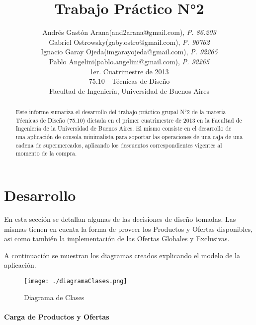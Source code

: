 \documentclass[a4paper,11pt]{article}
\title{\textbf{Trabajo Práctico N°2}}
\author{
  Andrés Gastón Arana(and2arana@gmail.com), \textit{P. 86.203}     \\
  Gabriel Ostrowsky(gaby.ostro@gmail.com), \textit{P. 90762}       \\
  Ignacio Garay Ojeda(imgarayojeda@gmail.com), \textit{P. 92265}   \\
  Pablo Angelini(pablo.angelini@gmail.com), \textit{P. 92265}      \\
  \normalsize{1er. Cuatrimestre de 2013}                           \\
  \normalsize{75.10 - Técnicas de Diseño}                          \\
  \normalsize{Facultad de Ingeniería, Universidad de Buenos Aires}
}
\date{}
\begin{document}
\thispagestyle{empty}
\maketitle

\begin{abstract}

  Este informe sumariza el desarrollo del trabajo práctico grupal N°2 de la
  materia Técnicas de Diseño (75.10) dictada en el primer cuatrimestre de 2013
  en la Facultad de Ingeniería de la Universidad de Buenos Aires. El mismo
  consiste en el desarrollo de una aplicación de consola minimalista para
  soportar las operaciones de una caja de una cadena de supermercados, 
  aplicando los descuentos correspondientes vigentes al momento de la compra.

\end{abstract}

\clearpage

\tableofcontents
\clearpage


\part{Desarrollo}
En esta sección se detallan algunas de las decisiones de diseño tomadas. Las 
mismas tienen en cuenta la forma de proveer los Productos y Ofertas disponibles, 
asi como también la implementación de las Ofertas Globales y Exclusivas.

A continuación se muestran los diagramas creados explicando el modelo de la aplicación.

\begin{figure}[!htp]
\begin{center}
\texttt{[image: ./diagramaClases.png]}
\end{center}
\caption{Diagrama de Clases} \label{fig001}
\end{figure}

\subsection{Carga de Productos y Ofertas}
\end{document}
